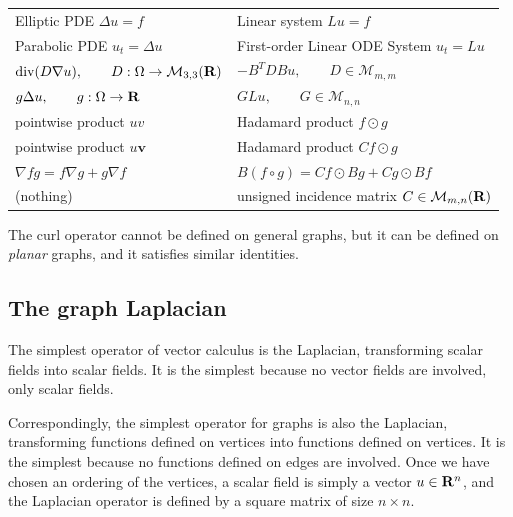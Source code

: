 \begin{tabular}{l|l}
		Elliptic PDE $\Delta u = f$&
		Linear system $Lu=f$\\
	
		Parabolic PDE $u_t = \Delta u$&
		First-order Linear ODE System $u_t=Lu$\\
	
		$\textrm{div}(D\nabla u),\qquad
			D:\Omega\to\mathcal{M}_{3,3}(\mathbf{R})$&
		$-B^TDBu,\qquad D\in\mathcal{M}_{m,m}$\\
	
		$g\Delta u,\qquad g:\Omega\to\mathbf{R}$&
		$GLu,\qquad G\in\mathcal{M}_{n,n}$\\
	
		pointwise product $u v$&
		Hadamard product $f\odot g$\\
	
		pointwise product $u\mathbf{v}$&
		Hadamard product $Cf\odot g$\\
	
		$\nabla fg=f\nabla g + g\nabla f$&
		$B(f\circ g)=Cf\odot Bg + Cg\odot Bf$\\
	
		(nothing)&
		unsigned incidence matrix $C\in\mathcal{M}_{m,n}(\mathbf{R})$\\
\end{tabular}


The $\mathrm{curl}$ operator cannot be defined on general graphs, but it
can be defined on \emph{planar} graphs, and it satisfies similar identities.




\subsection{The graph Laplacian}


The simplest operator of vector calculus is the Laplacian, transforming
scalar fields into scalar fields.  It is the simplest because no vector fields
are involved, only scalar fields.



Correspondingly, the simplest operator for graphs is also the Laplacian,
transforming functions defined on vertices into functions defined on
vertices.  It is the simplest because no functions defined on edges are
involved.  Once we have chosen an ordering of the vertices, a scalar field is
simply a vector $u\in\mathbf{R}^n$, and the Laplacian operator is defined by a square
matrix of size $n\times n$.


